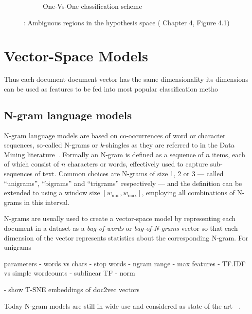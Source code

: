 \begin{figure}[h]
\begin{subfigure}[b]{0.4\textwidth}
        \caption{One-Vs-One classification scheme}
        \label{fig:Bishop2006aa-p182-ch4-fig4-1-b}
    \end{subfigure}
    \caption{: Ambiguous regions in the hypothesis space (\cite{Bishop:2006aa} Chapter 4, Figure 4.1) }
    \label{fig:Bishop2006aa-p182-ch4-fig4-1}
\end{figure}

\cite{Bishop:2006aa}


\section{Vector-Space Models}
\label{sec:vector-space-models}


Thus each document document vector has the same dimensionality its dimensions can be used as features to be fed into most popular classification metho

\subsection{N-gram language models}

N-gram language models are based on co-occurrences of word or character sequences, so-called N-grams or $k$-shingles as they are referred to in the Data Mining literature~\cite[Chapter 3.2, p.~72]{Leskovec:2014aa}. Formally an N-gram is defined as a sequence of $n$ items, each of which consist of $n$ characters or words, effectively used to capture sub-sequences of text. Common choices are N-grams of size 1, 2 or 3 --- called ``unigrams'', ``bigrams'' and ``trigrams'' respectively --- and the definition can be extended to using a window size $[\textit{w}_{\text{min}}, \textit{w}_{\text{max}}]$, employing all combinations of N-grams in this interval.

N-grams are usually used to create a vector-space model by representing each document in a dataset as a \textit{bag-of-words} or \textit{bag-of-N-grams} vector so that each dimension of the vector represents statistics about the corresponding N-gram. For unigrams

parameters
- words vs chars
- stop words
- ngram range
- max features
- TF.IDF vs simple wordcounts
- sublinear TF
- norm

- show T-SNE embeddings of doc2vec vectors

Today N-gram models are still in wide use and considered as state of the art ~\cite[p.~17]{Mikolov:2012aa}.

